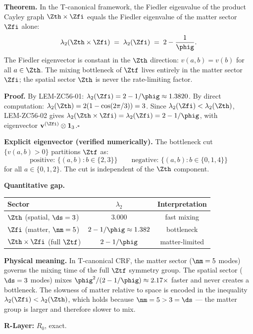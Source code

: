 \documentclass[12pt, a4paper]{article}
\begin{document}
\begin{formalbox}[title={THM-ZC56-01: Matter Bottleneck Theorem
  ($R_0$, Exact)}]
\textbf{Theorem.}
In the T-canonical framework, the Fiedler eigenvalue of the
product Cayley graph $\Zth\times\Zfi$ equals the Fiedler
eigenvalue of the matter sector $\Zfi$ alone:
\begin{equation}
  \lambda_2(\Zth\times\Zfi)
  \;=\; \lambda_2(\Zfi)
  \;=\; 2 - \frac{1}{\phig}.
  \label{eq:matter-bottleneck}
\end{equation}
The Fiedler eigenvector is constant in the $\Zth$ direction:
$v(a,b)=v(b)$ for all $a\in\Zth$.  The mixing bottleneck of
$\Ztf$ lives entirely in the matter sector $\Zfi$; the spatial
sector $\Zth$ is never the rate-limiting factor.

\textbf{Proof.}
By LEM-ZC56-01: $\lambda_2(\Zfi)=2-1/\phig\approx1.3820$.
By direct computation: $\lambda_2(\Zth)=2(1-\cos(2\pi/3))=3$.
Since $\lambda_2(\Zfi)<\lambda_2(\Zth)$, LEM-ZC56-02 gives
$\lambda_2(\Zth\times\Zfi)=\lambda_2(\Zfi)=2-1/\phig$,
with eigenvector $\mathbf{v}^{(\Zfi)}\otimes\mathbf{1}_3$.\hfill$\square$

\medskip
\textbf{Explicit eigenvector (verified numerically).}
The bottleneck cut $\{v(a,b)>0\}$ partitions $\Ztf$ as:
\[
  \text{positive: } \{(a,b): b\in\{2,3\}\}
  \qquad
  \text{negative: } \{(a,b): b\in\{0,1,4\}\}
\]
for all $a\in\{0,1,2\}$.  The cut is independent of the
$\Zth$ component.

\medskip
\textbf{Quantitative gap.}
\begin{center}
\begin{tabular}{@{}lcc@{}}
\toprule
Sector & $\lambda_2$ & Interpretation \\
\midrule
$\Zth$ (spatial, $\ds=3$) & $3.000$ & fast mixing \\
$\Zfi$ (matter, $\nm=5$)  & $2-1/\phig\approx1.382$ & bottleneck \\
$\Zth\times\Zfi$ (full $\Ztf$) & $2-1/\phig$ & matter-limited \\
\bottomrule
\end{tabular}
\end{center}

\medskip
\textbf{Physical meaning.}
In T-canonical CRF, the matter sector ($\nm=5$ modes) governs
the mixing time of the full $\Ztf$ symmetry group.
The spatial sector ($\ds=3$ modes) mixes $\phig^2/(2-1/\phig)
\approx2.17\times$ faster and never creates a bottleneck.
The slowness of matter relative to space is encoded in the
inequality $\lambda_2(\Zfi)<\lambda_2(\Zth)$, which holds
because $\nm=5>3=\ds$ --- the matter group is larger and
therefore slower to mix.

\textbf{R-Layer:} $R_0$, exact.
\end{formalbox}
\end{document}
